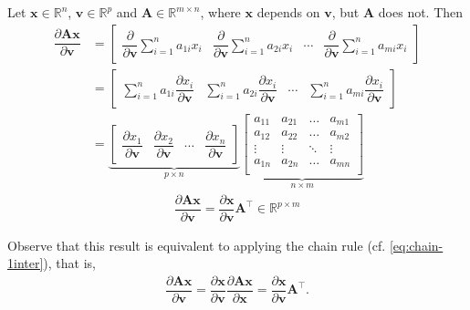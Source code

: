 \documentclass{article}
\newcommand{\trans}{\top}
\begin{document}
Let \(\mathbf{x} \in \mathbb{R}^{n}\), \(\mathbf{v} \in \mathbb{R}^{p}\) and \(\mathbf{A} \in \mathbb{R}^{m\times n}\), where \(\mathbf{x}\) depends on \(\mathbf{v}\), but \(\mathbf{A}\) does not. Then
\begin{align}
    \dfrac{\partial \mathbf{A}  \mathbf{x}}{\partial \mathbf{v}} & =
    \begin{bmatrix}
        \dfrac{\partial}{\partial \mathbf{v}}\sum_{i=1}^{n} a_{1i}x_i & \dfrac{\partial}{\partial \mathbf{v}}\sum_{i=1}^{n} a_{2i}x_i & \cdots & \dfrac{\partial}{\partial \mathbf{v}}\sum_{i=1}^{n} a_{mi}x_i
    \end{bmatrix} \\
    & = \begin{bmatrix}
        \sum_{i=1}^{n} a_{1i}\dfrac{\partial x_i}{\partial \mathbf{v}} & \sum_{i=1}^{n} a_{2i}\dfrac{\partial x_i}{\partial \mathbf{v}} & \cdots & \sum_{i=1}^{n} a_{mi}\dfrac{\partial x_i}{\partial \mathbf{v}}
    \end{bmatrix} \\
    & = \underbrace{\begin{bmatrix}
        \dfrac{\partial x_1}{\partial \mathbf{v}} & \dfrac{\partial x_2}{\partial \mathbf{v}} & \cdots & \dfrac{\partial x_n}{\partial \mathbf{v}}
    \end{bmatrix}}_{p \times n}
    \underbrace{\begin{bmatrix}
        a_{11} & a_{21} & \dots & a_{m1} \\
        a_{12} & a_{22} & \dots & a_{m2} \\
        \vdots & \vdots & \ddots & \vdots \\
        a_{1n} & a_{2n} & \dots & a_{mn} \\
    \end{bmatrix}}_{n \times m}
\end{align}
\begin{align}
    \boxed{\dfrac{\partial \mathbf{A}  \mathbf{x}}{\partial \mathbf{v}} = \dfrac{\partial \mathbf{x}}{\partial \mathbf{v}} \mathbf{A}^\trans \in \mathbb{R}^{p \times m}}
\end{align}

Observe that this result is equivalent to applying the chain rule (cf. \eqref{eq:chain-1inter}), that is,
\begin{align}
    \dfrac{\partial \mathbf{A}  \mathbf{x}}{\partial \mathbf{v}} = \dfrac{\partial \mathbf{x}}{\partial \mathbf{v}} \dfrac{\partial \mathbf{A}  \mathbf{x}}{\partial \mathbf{x}} = \dfrac{\partial \mathbf{x}}{\partial \mathbf{v}} \mathbf{A}^\trans.
\end{align}
\end{document}
